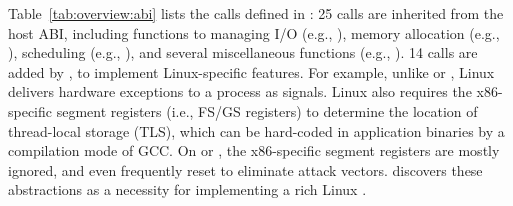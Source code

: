 




Table~\ref{tab:overview:abi} lists the \palcallnum{} calls defined in \thehostabi{}:
25 calls are inherited from the \drawbridge{} host ABI,
including functions to managing I/O (e.g., ), memory allocation (e.g., ), scheduling (e.g., ), and several miscellaneous functions (e.g., ).
14 calls are added by \graphene{}, to implement Linux-specific features.
For example, unlike \win{} or \osx{}, Linux %
delivers hardware exceptions to a process as signals.
Linux also requires 
the x86-specific segment registers (i.e., FS/GS registers)
to determine the location of thread-local storage (TLS), which can be hard-coded in application binaries by a compilation mode of GCC.
On \win{} or \osx{}, the x86-specific segment registers are mostly ignored, and even frequently reset to eliminate attack vectors.
\graphene{} discovers these abstractions as a necessity for implementing a rich Linux \libos{}.




